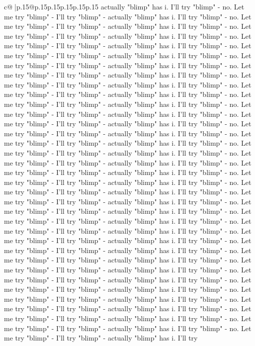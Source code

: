 \documentclass{article}
\begin{document}
{\begin{supertabular}{c@{$\;$}|p{.15\linewidth}@{}p{.15\linewidth}p{.15\linewidth}p{.15\linewidth}p{.15\linewidth}p{.15\linewidth}}
{{{actually "blimp" has i. I'll try "blimp" {-} no. Let me try "blimp" {-} I'll try "blimp" {-} actually "blimp" has i. I'll try "blimp" {-} no. Let me try "blimp" {-} I'll try "blimp" {-} actually "blimp" has i. I'll try "blimp" {-} no. Let me try "blimp" {-} I'll try "blimp" {-} actually "blimp" has i. I'll try "blimp" {-} no. Let me try "blimp" {-} I'll try "blimp" {-} actually "blimp" has i. I'll try "blimp" {-} no. Let me try "blimp" {-} I'll try "blimp" {-} actually "blimp" has i. I'll try "blimp" {-} no. Let me try "blimp" {-} I'll try "blimp" {-} actually "blimp" has i. I'll try "blimp" {-} no. Let me try "blimp" {-} I'll try "blimp" {-} actually "blimp" has i. I'll try "blimp" {-} no. Let me try "blimp" {-} I'll try "blimp" {-} actually "blimp" has i. I'll try "blimp" {-} no. Let me try "blimp" {-} I'll try "blimp" {-} actually "blimp" has i. I'll try "blimp" {-} no. Let me try "blimp" {-} I'll try "blimp" {-} actually "blimp" has i. I'll try "blimp" {-} no. Let me try "blimp" {-} I'll try "blimp" {-} actually "blimp" has i. I'll try "blimp" {-} no. Let me try "blimp" {-} I'll try "blimp" {-} actually "blimp" has i. I'll try "blimp" {-} no. Let me try "blimp" {-} I'll try "blimp" {-} actually "blimp" has i. I'll try "blimp" {-} no. Let me try "blimp" {-} I'll try "blimp" {-} actually "blimp" has i. I'll try "blimp" {-} no. Let me try "blimp" {-} I'll try "blimp" {-} actually "blimp" has i. I'll try "blimp" {-} no. Let me try "blimp" {-} I'll try "blimp" {-} actually "blimp" has i. I'll try "blimp" {-} no. Let me try "blimp" {-} I'll try "blimp" {-} actually "blimp" has i. I'll try "blimp" {-} no. Let me try "blimp" {-} I'll try "blimp" {-} actually "blimp" has i. I'll try "blimp" {-} no. Let me try "blimp" {-} I'll try "blimp" {-} actually "blimp" has i. I'll try "blimp" {-} no. Let me try "blimp" {-} I'll try "blimp" {-} actually "blimp" has i. I'll try "blimp" {-} no. Let me try "blimp" {-} I'll try "blimp" {-} actually "blimp" has i. I'll try "blimp" {-} no. Let me try "blimp" {-} I'll try "blimp" {-} actually "blimp" has i. I'll try "blimp" {-} no. Let me try "blimp" {-} I'll try "blimp" {-} actually "blimp" has i. I'll try "blimp" {-} no. Let me try "blimp" {-} I'll try "blimp" {-} actually "blimp" has i. I'll try "blimp" {-} no. Let me try "blimp" {-} I'll try "blimp" {-} actually "blimp" has i. I'll try "blimp" {-} no. Let me try "blimp" {-} I'll try "blimp" {-} actually "blimp" has i. I'll try "blimp" {-} no. Let me try "blimp" {-} I'll try "blimp" {-} actually "blimp" has i. I'll try "blimp" {-} no. Let me try "blimp" {-} I'll try "blimp" {-} actually "blimp" has i. I'll try "blimp" {-} no. Let me try "blimp" {-} I'll try "blimp" {-} actually "blimp" has i. I'll try "blimp" {-} no. Let me try "blimp" {-} I'll try "blimp" {-} actually "blimp" has i. I'll try "blimp" {-} no. Let me try "blimp" {-} I'll try "blimp" {-} actually "blimp" has i. I'll try "blimp" {-} no. Let me try "blimp" {-} I'll try "blimp" {-} actually "blimp" has i. I'll try "blimp" {-} no. Let me try "blimp" {-} I'll try "blimp" {-} actually "blimp" has i. I'll try "blimp" {-} no. Let me try "blimp" {-} I'll try "blimp" {-} actually "blimp" has i. I'll try }}}
\end{supertabular}}
\end{document}
